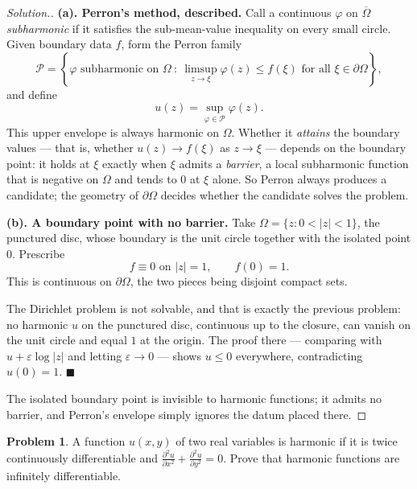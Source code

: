\documentclass[11pt,a4paper]{article}
\theoremstyle{definition}
\newtheorem{problemx}{Problem}[section]
\newenvironment{problem}{\begin{problemx}}{\end{problemx}}
\newenvironment{solution}
  {\renewcommand{\qedsymbol}{}\begin{proof}[\textit{Solution}.]}
  {\end{proof}}
\begin{document}
\begin{solution}
\textbf{(a). Perron's method, described.} Call a continuous $\varphi$ on
$\overline{\Omega}$ \emph{subharmonic} if it satisfies the sub-mean-value
inequality on every small circle. Given boundary data $f$, form the Perron family
$$\mathcal{P} = \left\{\varphi \text{ subharmonic on } \Omega \ :\
\limsup_{z \to \xi}\varphi(z) \leq f(\xi) \text{ for all } \xi \in \partial\Omega\right\},$$
and define
$$u(z) = \sup_{\varphi \in \mathcal{P}} \varphi(z).$$
This upper envelope is always harmonic on $\Omega$. Whether it \emph{attains} the
boundary values --- that is, whether $u(z) \to f(\xi)$ as $z \to \xi$ --- depends on
the boundary point: it holds at $\xi$ exactly when $\xi$ admits a \emph{barrier}, a
local subharmonic function that is negative on $\Omega$ and tends to $0$ at $\xi$
alone. So Perron always produces a candidate; the geometry of $\partial\Omega$
decides whether the candidate solves the problem.

\textbf{(b). A boundary point with no barrier.} Take
$\Omega = \{z : 0 < \left|z\right| < 1\}$, the punctured disc, whose boundary is
the unit circle together with the isolated point $0$. Prescribe
$$f \equiv 0 \text{ on } \left|z\right| = 1,\qquad f(0) = 1 .$$
This is continuous on $\partial\Omega$, the two pieces being disjoint compact sets.

The Dirichlet problem is not solvable, and that is exactly the previous problem:
no harmonic $u$ on the punctured disc, continuous up to the closure, can vanish on
the unit circle and equal $1$ at the origin. The proof there --- comparing with
$u + \varepsilon\log\left|z\right|$ and letting $\varepsilon \to 0$ --- shows
$u \leq 0$ everywhere, contradicting $u(0) = 1$. $\blacksquare$

The isolated boundary point is invisible to harmonic functions; it admits no
barrier, and Perron's envelope simply ignores the datum placed there.
\end{solution}


\begin{problem}
A function $u(x,y)$ of two real variables is harmonic if it is twice
continuously differentiable and
$\frac{\partial^{2}u}{\partial x^{2}} + \frac{\partial^{2}u}{\partial y^{2}} = 0$.
Prove that harmonic functions are infinitely differentiable.
\end{problem}
\end{document}
